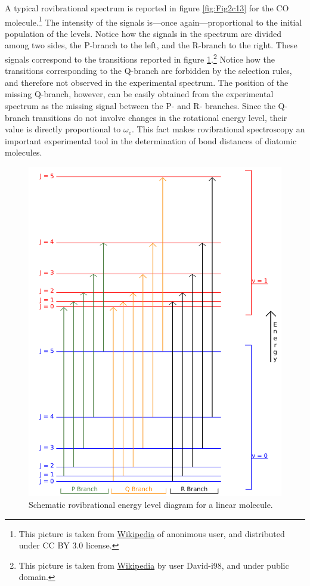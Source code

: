 \documentclass[
  9pt,
]{extbook}
\theoremstyle{definition}
\theoremstyle{definition}
\theoremstyle{definition}
\theoremstyle{remark}
\begin{document}
A typical rovibrational spectrum is reported in figure \ref{fig:Fig2c13} for the \(\mathrm{CO}\) molecule.\footnote{This picture is taken from \href{https://en.wikipedia.org/wiki/Rotational–vibrational_spectroscopy\#/media/File:Vib_rot_CO.png}{Wikipedia} of anonimous user, and distributed under CC BY 3.0 license.} The intensity of the signals is---once again---proportional to the initial population of the levels. Notice how the signals in the spectrum are divided among two sides, the P-branch to the left, and the R-branch to the right. These signals correspond to the transitions reported in figure \ref{fig:Fig3c13}.\footnote{This picture is taken from \href{https://en.wikipedia.org/wiki/Rotational–vibrational_spectroscopy\#/media/File:Vibrationrotationenergy.svg}{Wikipedia} by user David-i98, and under public domain.} Notice how the transitions corresponding to the Q-branch are forbidden by the selection rules, and therefore not observed in the experimental spectrum. The position of the missing Q-branch, however, can be easily obtained from the experimental spectrum as the missing signal between the P- and R- branches. Since the Q-branch transitions do not involve changes in the rotational energy level, their value is directly proportional to \(\omega_e\). This fact makes rovibrational spectroscopy an important experimental tool in the determination of bond distances of diatomic molecules.

\begin{figure}

{\centering \includegraphics[width=0.5\linewidth]{./img/OEP_wiki7} 

}

\caption{Schematic rovibrational energy level diagram for a linear molecule.}\label{fig:Fig3c13}
\end{figure}
\end{document}
